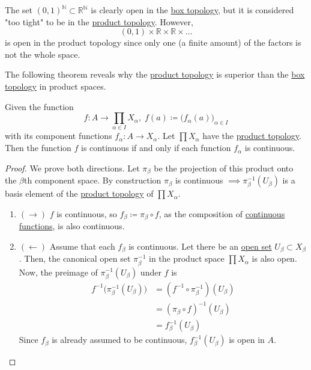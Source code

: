   \begin{example}
    \label{ex:a-box-open-set-that-is-not-product-open}
    The set $(0,1)^\mathbb{N} \subset \mathbb{R}^\mathbb{N}$ is clearly open in the \hyperref[def:box-topology]{box topology}, but it is considered "too tight" to be in the \hyperref[def:product-topology]{product topology}. However, 
    \begin{equation}
      (0,1) \times \mathbb{R} \times \mathbb{R} \times \ldots
    \end{equation}
    is open in the product topology since only one (a finite amount) of the factors is not the whole space. 
  \end{example}

  The following theorem reveals why the \hyperref[def:product-topology]{product topology} is superior than the \hyperref[def:box-topology]{box topology} in product spaces. 

  \begin{theorem}
    \label{thm:continuity-of-functions-mapped-to-product}
    Given the function 
    \begin{equation}
      f: A \rightarrow \prod_{\alpha \in I} X_\alpha, \; f(a) \coloneqq \big( f_\alpha (a) \big)_{\alpha \in I}
    \end{equation}
    with its component functions $f_\alpha: A \rightarrow X_\alpha$. Let $\prod X_\alpha$ have the \hyperref[def:product-topology]{product topology}. Then the function $f$ is continuous if and only if each function $f_\alpha$ is continuous. 
  \end{theorem}
  \begin{proof}
    We prove both directions. Let $\pi_\beta$ be the projection of this product onto the $\beta$th component space. By construction $\pi_\beta$ is continuous $\implies \pi_\beta^{-1} (U_\beta)$ is a basis element of the \hyperref[def:product-topology]{product topology} of $\prod X_\alpha$. 
    \begin{enumerate}
      \item $(\rightarrow)$ $f$ is continuous, so $f_\beta \coloneqq \pi_\beta \circ f$, as the composition of \hyperref[def:continuous_func]{continuous functions}, is also continuous. 
      \item $(\leftarrow)$ Assume that each $f_\beta$ is continuous. Let there be an \hyperref[def:open-set]{open set} $U_\beta \subset X_\beta$. Then, the canonical open set $\pi_\beta^{-1}$ in the product space $\prod X_\alpha$ is also open. Now, the preimage of $\pi_\beta^{-1} (U_\beta)$ under $f$ is 
      \begin{align*}
        f^{-1} \big( \pi_\beta^{-1} (U_\beta)\big) & = (f^{-1} \circ \pi_\beta^{-1})(U_\beta) \\
        & = (\pi_\beta \circ f)^{-1} (U_\beta) \\
        & = f_\beta^{-1} (U_\beta)
      \end{align*}
      Since $f_\beta$ is already assumed to be continuous, $f_\beta^{-1} (U_\beta)$ is open in $A$. 
    \end{enumerate}
  \end{proof} 

